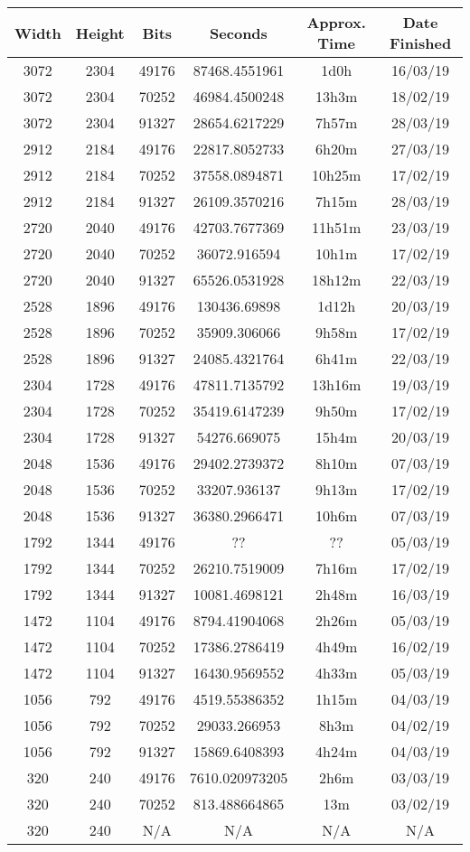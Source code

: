   \begin{center}
  \begin{tabular}{ c c c | c c c }
  Width & Height & Bits & Seconds & Approx. Time & Date Finished \\ \hline
  3072 & 2304 & 49176 & 87468.4551961 & 1d0h & 16/03/19 \\
  3072 & 2304 & 70252 & 46984.4500248 & 13h3m & 18/02/19 \\
  3072 & 2304 & 91327 & 28654.6217229 & 7h57m & 28/03/19 \\
  2912 & 2184 & 49176 & 22817.8052733 & 6h20m & 27/03/19 \\
  2912 & 2184 & 70252 & 37558.0894871 & 10h25m & 17/02/19 \\
  2912 & 2184 & 91327 & 26109.3570216 & 7h15m & 28/03/19 \\
  2720 & 2040 & 49176 & 42703.7677369 & 11h51m & 23/03/19 \\
  2720 & 2040 & 70252 & 36072.916594 & 10h1m & 17/02/19 \\
  2720 & 2040 & 91327 & 65526.0531928 & 18h12m & 22/03/19 \\
  2528 & 1896 & 49176 & 130436.69898 & 1d12h & 20/03/19 \\
  2528 & 1896 & 70252 & 35909.306066 & 9h58m & 17/02/19 \\
  2528 & 1896 & 91327 & 24085.4321764 & 6h41m & 22/03/19 \\
  2304 & 1728 & 49176 & 47811.7135792 & 13h16m & 19/03/19 \\
  2304 & 1728 & 70252 & 35419.6147239 & 9h50m & 17/02/19 \\
  2304 & 1728 & 91327 & 54276.669075 & 15h4m & 20/03/19 \\
  2048 & 1536 & 49176 & 29402.2739372 & 8h10m & 07/03/19 \\
  2048 & 1536 & 70252 & 33207.936137 & 9h13m & 17/02/19 \\
  2048 & 1536 & 91327 & 36380.2966471 & 10h6m & 07/03/19 \\
  1792 & 1344 & 49176 & ?? & ?? & 05/03/19 \\ %
  1792 & 1344 & 70252 & 26210.7519009 & 7h16m & 17/02/19 \\
  1792 & 1344 & 91327 & 10081.4698121 & 2h48m & 16/03/19 \\
  1472 & 1104 & 49176 & 8794.41904068 & 2h26m & 05/03/19 \\
  1472 & 1104 & 70252 & 17386.2786419 & 4h49m & 16/02/19 \\
  1472 & 1104 & 91327 & 16430.9569552 & 4h33m & 05/03/19 \\
  1056 & 792 & 49176 & 4519.55386352 & 1h15m & 04/03/19 \\
  1056 & 792 & 70252 & 29033.266953 & 8h3m & 04/02/19 \\
  1056 & 792 & 91327 & 15869.6408393 & 4h24m & 04/03/19 \\
  320 & 240 & 49176 & 7610.020973205 & 2h6m & 03/03/19 \\
  320 & 240 & 70252 & 813.488664865 & 13m & 03/02/19 \\
  320 & 240 & N/A & N/A & N/A & N/A \\
  \end{tabular}
  \end{center}
  
